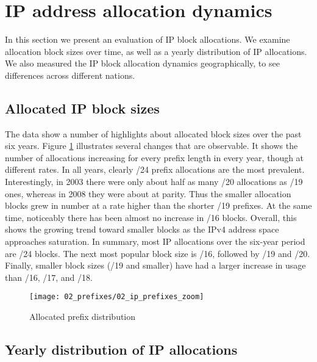 \section{IP address allocation dynamics}
\label{sec:allocations}

In this section we present an evaluation of IP block allocations. We examine
allocation block sizes over time, as well as a yearly distribution of IP
allocations. We also measured the IP block allocation dynamics geographically,
to see differences across different nations.

\subsection{Allocated IP block sizes}

The data show a number of highlights about allocated block sizes over the past
six years. Figure \ref{fig:IP allocations} illustrates several changes that
are observable. It shows the number of allocations increasing for every prefix
length in every year, though at different rates. In all years, clearly /24
prefix allocations are the most prevalent. Interestingly, in 2003 there were
only about half as many /20 allocations as /19 ones, whereas in 2008 they were
about at parity. Thus the smaller allocation blocks grew in number at a rate
higher than the shorter /19 prefixes. At the same time, noticeably there has
been almost no increase in /16 blocks. Overall, this shows the growing trend
toward smaller blocks as the IPv4 address space approaches saturation. In
summary, most IP allocations over the six-year period are /24 blocks. The next
most popular block size is /16, followed by /19 and /20. Finally, smaller
block sizes (/19 and smaller) have had a larger increase in usage than /16,
/17, and /18.

\begin{figure}[htbp]
 	\centering
 		\texttt{[image: 02\_prefixes/02\_ip\_prefixes\_zoom]}
	\caption{Allocated prefix distribution}
 	\label{fig:IP allocations}
\end{figure}

\subsection{Yearly distribution of IP allocations}


